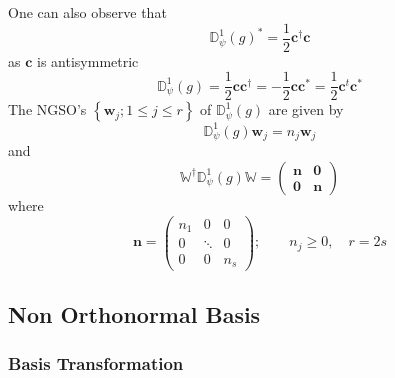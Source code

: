 \documentclass[aps,preprint]{revtex4}
\begin{document}
One can also observe that 
\begin{equation}
\mathbb{D}_{\psi }^{1}\left( g\right) ^{\ast }=\frac{1}{2}\mathbf{c}%
^{\dagger }\mathbf{c}
\end{equation}%
as $\mathbf{c}$ is antisymmetric 
\begin{equation}
\mathbb{D}_{\psi }^{1}\left( g\right) =\frac{1}{2}\mathbf{cc}^{\dagger }=-%
\frac{1}{2}\mathbf{cc}^{\ast }=\frac{1}{2}\mathbf{c}^{t}\mathbf{c}^{\ast }
\end{equation}%
The NGSO's $\left\{ \mathbf{w}_{j};1\leq j\leq r\right\} $ of $\mathbb{D}%
_{\psi }^{1}\left( g\right) $ are given by 
\begin{equation}
\mathbb{D}_{\psi }^{1}\left( g\right) \mathbf{w}_{j}=n_{j}\mathbf{w}_{j}
\end{equation}%
and 
\begin{equation}
\mathbb{W}^{\dagger }\mathbb{D}_{\psi }^{1}\left( g\right) \mathbb{W=}\left( 
\begin{array}{cc}
\mathbf{n} & \mathbf{0} \\ 
\mathbf{0} & \mathbf{n}%
\end{array}%
\right) 
\end{equation}%
where 
\begin{equation}
\mathbf{n=}\left( 
\begin{array}{ccc}
n_{1} & 0 & 0 \\ 
0 & \ddots  & 0 \\ 
0 & 0 & n_{s}%
\end{array}%
\right) ;\qquad n_{j}\geq 0,\quad r=2s
\end{equation}

\subsection{Non Orthonormal Basis}

\subsubsection{Basis Transformation}
\end{document}

